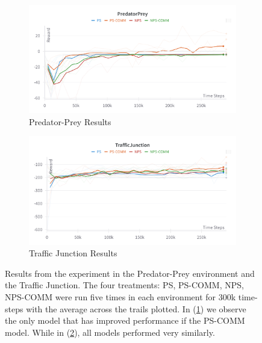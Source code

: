 \documentclass{article}
\begin{document}
\

\begin{figure}[h]
    \centering
    \begin{subfigure}[b]{0.9\textwidth}
        \centering
        \includegraphics[width=\textwidth]{images/PredatorPreyResults.png}
        \caption{Predator-Prey Results}
        \label{fig:predator_prey_results}
    \end{subfigure}
    \hfill
    \begin{subfigure}[b]{0.9\textwidth}
        \centering
        \includegraphics[width=\textwidth]{images/TrafficJunctionResults}
        \caption{Traffic Junction Results}
        \label{fig:traffic_junction_results}
    \end{subfigure}
    \caption{Results from the experiment in the Predator-Prey environment and the Traffic Junction. The four treatments: PS, PS-COMM, NPS, NPS-COMM were run five times in each environment for 300k time-steps with the average across the trails plotted. In (\ref{fig:predator_prey_results}) we observe the only model that has improved performance if the PS-COMM model. While in (\ref{fig:traffic_junction_results}), all models performed very similarly.}
    \label{fig:results}
\end{figure}
\end{document}
